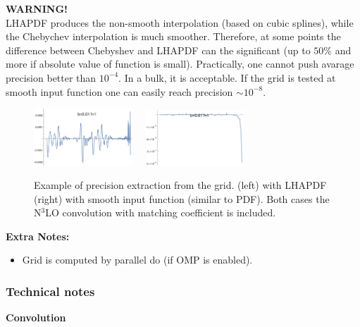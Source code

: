 \documentclass[prd,nofootinbib,eqsecnum,final]{revtex4}
\renewcommand{\(}{\left(}
\renewcommand{\)}{\right)}
\renewcommand{\[}{\left[}
\renewcommand{\]}{\right]}
\newcommand{\red}[1]{{\color[rgb]{1,0,0} #1}}
\begin{document}
\begin{tcolorbox}
\begin{center}
\textbf{\red{WARNING!}}
\\
LHAPDF produces the non-smooth interpolation (based on cubic splines), while the Chebychev interpolation is much smoother. Therefore, at some points the difference between Chebyshev and LHAPDF can the significant (up to $50\%$ and more if absolute value of function is small). Practically, one cannot push avarage precision better than $10^{-4}$. In a bulk, it is acceptable. If the grid is tested at smooth input function one can easily reach precision $\sim 10^{-8}$.
\end{center}
\end{tcolorbox}

\begin{figure}
\begin{center}
\includegraphics[width=0.33\textwidth]{Figures/Grid_ex1.pdf}~~
\includegraphics[width=0.33\textwidth]{Figures/Grid_ex2.pdf}
\caption{\label{fig:OPE1} Example of precision extraction from the grid. (left) with LHAPDF (right) with smooth input function (similar to PDF). Both cases the N$^3$LO convolution with matching coefficient is included.}
\end{center}
\end{figure}


\textbf{Extra Notes:}
\begin{itemize}
\item Grid is computed by parallel do (if OMP is enabled).
\end{itemize}

\subsubsection{Technical notes}
\label{sec:technicalNote_1}

\begin{center}
\textbf{Convolution}
\end{center}
\end{document}
